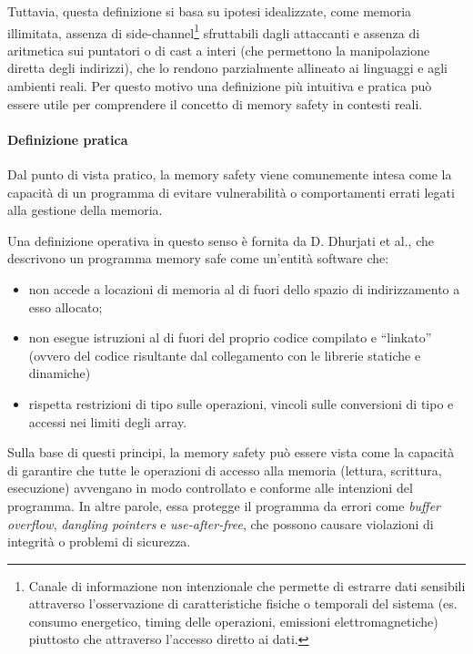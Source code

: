 Tuttavia, questa definizione si basa su ipotesi idealizzate, come memoria illimitata,
assenza di side-channel\footnote{Canale di informazione non intenzionale che
permette di estrarre dati sensibili attraverso l'osservazione di caratteristiche
fisiche o temporali del sistema (es. consumo energetico, timing delle operazioni,
emissioni elettromagnetiche) piuttosto che attraverso l'accesso diretto ai dati.}
sfruttabili dagli attaccanti e assenza di aritmetica sui puntatori o di cast a interi
(che permettono la manipolazione diretta degli indirizzi), che lo rendono
parzialmente allineato ai linguaggi e agli ambienti reali. Per questo motivo una
definizione più intuitiva e pratica può essere utile per comprendere il concetto
di memory safety in contesti reali.

\paragraph{Definizione pratica}

Dal punto di vista pratico, la memory safety viene comunemente intesa come la
capacità di un programma di evitare vulnerabilità o comportamenti errati legati
alla gestione della memoria.

Una definizione operativa in questo senso è fornita da D. Dhurjati et al.\cite{memory_safety_without_runtime_checks},
che descrivono un programma memory safe come un'entità software che:
\begin{itemize}
  \item non accede a locazioni di memoria al di fuori dello spazio di indirizzamento
    a esso allocato;

  \item non esegue istruzioni al di fuori del proprio codice compilato e ``linkato''
    (ovvero del codice risultante dal collegamento con le librerie statiche e
    dinamiche)

  \item rispetta restrizioni di tipo sulle operazioni, vincoli sulle conversioni
    di tipo e accessi nei limiti degli array.
\end{itemize}

Sulla base di questi principi, la memory safety può essere vista come la capacità
di garantire che tutte le operazioni di accesso alla memoria (lettura, scrittura,
esecuzione) avvengano in modo controllato e conforme alle intenzioni del programma.
In altre parole, essa protegge il programma da errori come \textit{buffer
overflow}, \textit{dangling pointers} e \textit{use-after-free}, che possono
causare violazioni di integrità o problemi di sicurezza.

